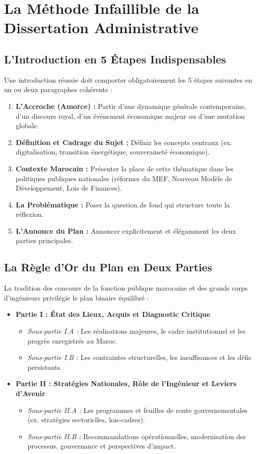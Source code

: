 \section{La Méthode Infaillible de la Dissertation Administrative}

\subsection{L'Introduction en 5 Étapes Indispensables}
Une introduction réussie doit comporter obligatoirement les 5 étapes suivantes en un ou deux paragraphes cohérents :
\begin{enumerate}
    \item \textbf{L'Accroche (Amorce) :} Partir d'une dynamique générale contemporaine, d'un discours royal, d'un événement économique majeur ou d'une mutation globale.
    \item \textbf{Définition et Cadrage du Sujet :} Définir les concepts centraux (ex. digitalisation, transition énergétique, souveraineté économique).
    \item \textbf{Contexte Marocain :} Présenter la place de cette thématique dans les politiques publiques nationales (réformes du MEF, Nouveau Modèle de Développement, Lois de Finances).
    \item \textbf{La Problématique :} Poser la question de fond qui structure toute la réflexion.
    \item \textbf{L'Annonce du Plan :} Annoncer explicitement et élégamment les deux parties principales.
\end{enumerate}

\subsection{La Règle d'Or du Plan en Deux Parties}
La tradition des concours de la fonction publique marocaine et des grands corps d'ingénieurs privilégie le plan binaire équilibré :
\begin{itemize}
    \item \textbf{Partie I : État des Lieux, Acquis et Diagnostic Critique}
    \begin{itemize}
        \item \textit{Sous-partie I.A :} Les réalisations majeures, le cadre institutionnel et les progrès enregistrés au Maroc.
        \item \textit{Sous-partie I.B :} Les contraintes structurelles, les insuffisances et les défis persistants.
    \end{itemize}
    \item \textbf{Partie II : Stratégies Nationales, Rôle de l'Ingénieur et Leviers d'Avenir}
    \begin{itemize}
        \item \textit{Sous-partie II.A :} Les programmes et feuilles de route gouvernementales (ex. stratégies sectorielles, lois-cadres).
        \item \textit{Sous-partie II.B :} Recommandations opérationnelles, modernisation des processus, gouvernance et perspectives d'impact.
    \end{itemize}
\end{itemize}

